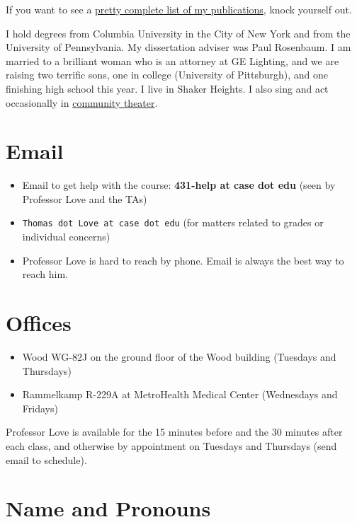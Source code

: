 \documentclass[
]{book}
\providecommand{\tightlist}{%
  \setlength{\itemsep}{0pt}\setlength{\parskip}{0pt}}
\begin{document}
If you want to see a \href{https://www.ncbi.nlm.nih.gov/myncbi/thomas.love.1/bibliography/public/}{pretty complete list of my publications}, knock yourself out.

I hold degrees from Columbia University in the City of New York and from the University of Pennsylvania. My dissertation adviser was Paul Rosenbaum. I am married to a brilliant woman who is an attorney at GE Lighting, and we are raising two terrific sons, one in college (University of Pittsburgh), and one finishing high school this year. I live in Shaker Heights. I also sing and act occasionally in \href{https://github.com/THOMASELOVE/theater}{community theater}.

\hypertarget{email-1}{%
\section{Email}\label{email-1}}

\begin{itemize}
\tightlist
\item
  Email to get help with the course: \textbf{431-help at case dot edu} (seen by Professor Love and the TAs)
\item
  \texttt{Thomas\ dot\ Love\ at\ case\ dot\ edu} (for matters related to grades or individual concerns)
\item
  Professor Love is hard to reach by phone. Email is always the best way to reach him.
\end{itemize}

\hypertarget{offices-1}{%
\section{Offices}\label{offices-1}}

\begin{itemize}
\tightlist
\item
  Wood WG-82J on the ground floor of the Wood building (Tuesdays and Thursdays)
\item
  Rammelkamp R-229A at MetroHealth Medical Center (Wednesdays and Fridays)
\end{itemize}

Professor Love is available for the 15 minutes before and the 30 minutes after each class, and otherwise by appointment on Tuesdays and Thursdays (send email to schedule).

\hypertarget{name-and-pronouns}{%
\section{Name and Pronouns}\label{name-and-pronouns}}
\end{document}
